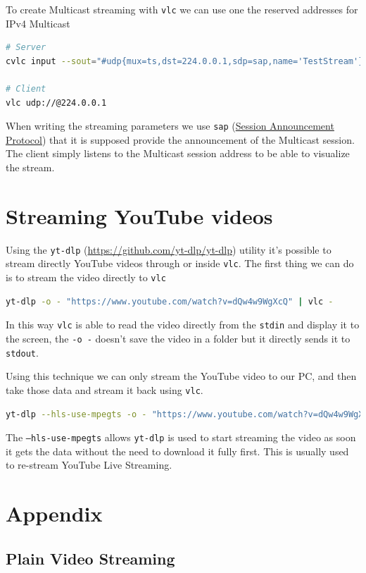 \documentclass{exam}
\begin{document}
To create Multicast streaming with \texttt{vlc} we can use one the reserved addresses for IPv4 Multicast
\begin{lstlisting}[language=bash]
# Server
cvlc input --sout="#udp{mux=ts,dst=224.0.0.1,sdp=sap,name='TestStream'}"

# Client
vlc udp://@224.0.0.1
\end{lstlisting}
When writing the streaming parameters we use \texttt{sap} (\href{https://datatracker.ietf.org/doc/html/rfc2974}{Session Announcement Protocol}) that it is supposed provide the announcement of the Multicast session. The client simply listens to the Multicast session address to be able to visualize the stream.

\section{Streaming YouTube videos}
Using the \texttt{yt-dlp} (\href{https://github.com/yt-dlp/yt-dlp}{https://github.com/yt-dlp/yt-dlp}) utility it's possible to stream directly YouTube videos through or inside \texttt{vlc}. The first thing we can do is to stream the video directly to \texttt{vlc}
\begin{lstlisting}[language=bash]
yt-dlp -o - "https://www.youtube.com/watch?v=dQw4w9WgXcQ" | vlc -
\end{lstlisting}
In this way \texttt{vlc} is able to read the video directly from the \texttt{stdin} and display it to the screen, the \texttt{-o -} doesn't save the video in a folder but it directly sends it to \texttt{stdout}.

Using this technique we can only stream the YouTube video to our PC, and then take those data and stream it back using \texttt{vlc}.
\begin{lstlisting}[language=bash]
yt-dlp --hls-use-mpegts -o - "https://www.youtube.com/watch?v=dQw4w9WgXcQ" | cvlc - --sout="#udp{mux=ts,dst=224.0.0.1,sdp=sap,name='YoutubeSteaming'}"
\end{lstlisting}
The \texttt{--hls-use-mpegts} allows \texttt{yt-dlp} is used to start streaming the video as soon it gets the data without the need to download it fully first. This is usually used to re-stream YouTube Live Streaming.

\pagebreak
\section{Appendix}

\subsection{Plain Video Streaming}
\end{document}
